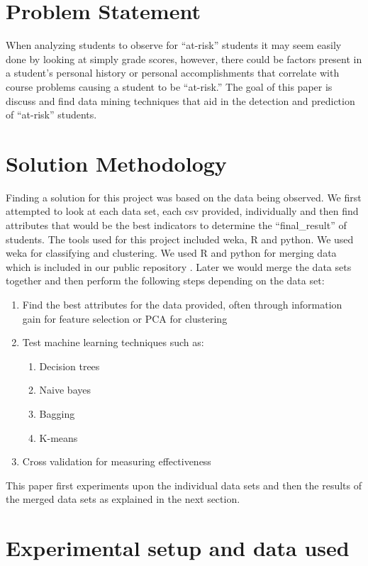 \documentclass[12pt]{article}
\begin{document}
\section{Problem Statement}

When analyzing students to observe for ``at-risk'' students it may seem easily done by looking at simply grade scores, however, there could be factors
present in a student's personal history or personal accomplishments that correlate with course problems causing a student to be ``at-risk.'' The goal of this paper is discuss and find data mining techniques that aid in the detection and prediction of ``at-risk'' students.

\section{Solution Methodology}

Finding a solution for this project was based on the data being observed. We first attempted to look at each data set, each csv provided, individually and then find attributes that would be the best indicators to determine the ``final\_result'' of students. The tools used for this project included weka, R and python. We used weka for classifying and clustering. We used R and python for merging data which is included in our public repository \cite{github}. Later we would merge the data sets together and then perform the following steps depending on the data set:

\begin{enumerate}
  \item Find the best attributes for the data provided, often through information gain for feature selection or PCA for clustering
  \item Test machine learning techniques such as:
  \begin{enumerate}
     \item Decision trees
     \item Naive bayes
     \item Bagging
     \item K-means
  \end{enumerate}
  \item Cross validation for measuring effectiveness
\end{enumerate}

This paper first experiments upon the individual data sets and then the results of the merged data sets as explained in the next section.

\section{Experimental setup and data used}
\end{document}
